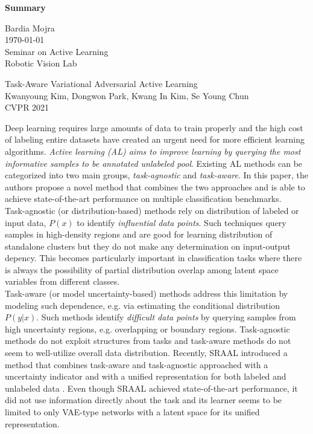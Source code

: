 \documentclass[12pt]{article}
\begin{document}
\begin{center}
\textbf{Summary}\\
\end{center}

\noindent
Bardia Mojra\\
\today\\
Seminar on Active Learning\\
Robotic Vision Lab\\
\begin{center}
{\large Task-Aware Variational Adversarial Active Learning\\}
  {\small Kwanyoung Kim, Dongwon Park, Kwang In Kim, Se Young Chun}\\
  {\small CVPR 2021}\\
\end{center}

Deep learning requires large amounts of data to train properly and the high
cost of
labeling entire datasets have created an urgent need for more efficient
learning algorithms. \textit{Active learning (AL) aims to improve learning by
querying the most informative samples to be annotated unlabeled pool}.
Existing AL methods can be categorized into two main groups,
\textit{task-agnostic} and \textit{task-aware}. In this paper, the authors
propose a novel method that combines the two approaches and is able to achieve
state-of-the-art performance on multiple classification benchmarks.\\

Task-agnostic (or distribution-based) methods rely on distribution of labeled
or input data, \(P(x)\) to identify \textit{influential data points}. Such techniques
query samples in high-density regions and are good for learning distribution of
standalone clusters but they do not make any determination on input-output
depency. This becomes particularly important in classification
tasks where there is always the possibility of partial distribution overlap
among latent space variables from different classes.\\

Task-aware (or model uncertainty-based) methods address this limitation by
modeling such dependence,
e.g. via estimating the conditional distribution \(P(y|x)\). Such methods
identify \textit{difficult data points} by querying samples from high uncertainty
regions, e.g. overlapping or boundary regions.
Task-agnostic methods do not exploit structures from tasks and task-aware
methods do not seem to well-utilize overall data distribution. Recently,
SRAAL introduced a method that combines task-aware and
task-agnostic approached with a uncertainty indicator and with a unified
representation for both labeled and unlabeled data \cite{SRAAL}.
Even though SRAAL achieved state-of-the-art performance, it did not use
information directly about the task \cite{LearningLoss} and its learner
seems to be limited to only VAE-type networks with a latent space for its
unified representation.\\
\end{document}
